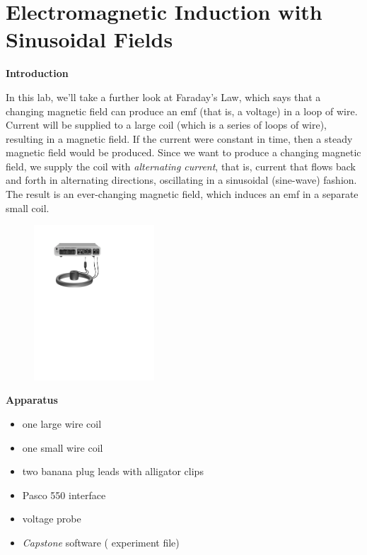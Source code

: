 
\section{Electromagnetic Induction with Sinusoidal Fields}

\makelabheader %

\bigskip

\textbf{Introduction}

In this lab, we'll take a further look at Faraday's Law, which says
that a changing magnetic field can produce an emf (that is, a voltage)
in a loop of wire.  Current will be supplied to a large coil (which is a 
series of loops of wire), resulting in a magnetic field.  
If the current were constant in time,
then a steady magnetic field would be produced.  Since we want to
produce a changing magnetic field, we supply the coil with {\it
alternating current}, that is, current that flows back and forth in
alternating directions, oscillating in a sinusoidal (sine-wave) fashion.  The
result is an ever-changing magnetic field, which induces an emf in
a separate small coil.

\begin{figure}
\vspace{0.4in}

\hspace{0.4in}
    \includegraphics[width=0.4\textwidth]{induction_sinusoidal/induction2_setup_550.pdf}
\end{figure}

\bigskip

\textbf{Apparatus}
\begin{itemize}
\setlength\itemsep{0pt} %
\item one large wire coil
\item one small wire coil
\item two banana plug leads with alligator clips
\item Pasco 550 interface
\item voltage probe
\item \textit{Capstone} software ( experiment file)
\end{itemize}

